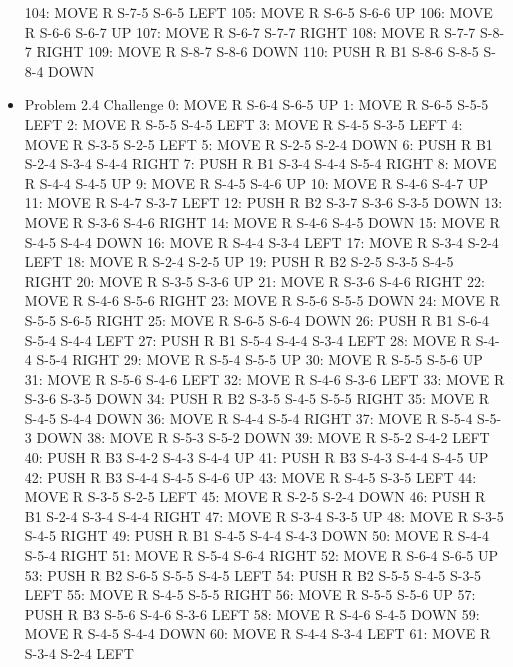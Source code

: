 \documentclass[12pt]{article}
\begin{document}
\begin{appendix}
\begin{itemize}
      104: MOVE R S-7-5 S-6-5 LEFT
      105: MOVE R S-6-5 S-6-6 UP
      106: MOVE R S-6-6 S-6-7 UP
      107: MOVE R S-6-7 S-7-7 RIGHT
      108: MOVE R S-7-7 S-8-7 RIGHT
      109: MOVE R S-8-7 S-8-6 DOWN
      110: PUSH R B1 S-8-6 S-8-5 S-8-4 DOWN
    \item Problem 2.4 Challenge
     0: MOVE R S-6-4 S-6-5 UP
        1: MOVE R S-6-5 S-5-5 LEFT
        2: MOVE R S-5-5 S-4-5 LEFT
        3: MOVE R S-4-5 S-3-5 LEFT
        4: MOVE R S-3-5 S-2-5 LEFT
        5: MOVE R S-2-5 S-2-4 DOWN
        6: PUSH R B1 S-2-4 S-3-4 S-4-4 RIGHT
        7: PUSH R B1 S-3-4 S-4-4 S-5-4 RIGHT
        8: MOVE R S-4-4 S-4-5 UP
        9: MOVE R S-4-5 S-4-6 UP
       10: MOVE R S-4-6 S-4-7 UP
       11: MOVE R S-4-7 S-3-7 LEFT
       12: PUSH R B2 S-3-7 S-3-6 S-3-5 DOWN
       13: MOVE R S-3-6 S-4-6 RIGHT
       14: MOVE R S-4-6 S-4-5 DOWN
       15: MOVE R S-4-5 S-4-4 DOWN
       16: MOVE R S-4-4 S-3-4 LEFT
       17: MOVE R S-3-4 S-2-4 LEFT
       18: MOVE R S-2-4 S-2-5 UP
       19: PUSH R B2 S-2-5 S-3-5 S-4-5 RIGHT
       20: MOVE R S-3-5 S-3-6 UP
       21: MOVE R S-3-6 S-4-6 RIGHT
       22: MOVE R S-4-6 S-5-6 RIGHT
       23: MOVE R S-5-6 S-5-5 DOWN
       24: MOVE R S-5-5 S-6-5 RIGHT
       25: MOVE R S-6-5 S-6-4 DOWN
       26: PUSH R B1 S-6-4 S-5-4 S-4-4 LEFT
       27: PUSH R B1 S-5-4 S-4-4 S-3-4 LEFT
       28: MOVE R S-4-4 S-5-4 RIGHT
       29: MOVE R S-5-4 S-5-5 UP
       30: MOVE R S-5-5 S-5-6 UP
       31: MOVE R S-5-6 S-4-6 LEFT
       32: MOVE R S-4-6 S-3-6 LEFT
       33: MOVE R S-3-6 S-3-5 DOWN
       34: PUSH R B2 S-3-5 S-4-5 S-5-5 RIGHT
       35: MOVE R S-4-5 S-4-4 DOWN
       36: MOVE R S-4-4 S-5-4 RIGHT
       37: MOVE R S-5-4 S-5-3 DOWN
       38: MOVE R S-5-3 S-5-2 DOWN
       39: MOVE R S-5-2 S-4-2 LEFT
       40: PUSH R B3 S-4-2 S-4-3 S-4-4 UP
       41: PUSH R B3 S-4-3 S-4-4 S-4-5 UP
       42: PUSH R B3 S-4-4 S-4-5 S-4-6 UP
       43: MOVE R S-4-5 S-3-5 LEFT
       44: MOVE R S-3-5 S-2-5 LEFT
       45: MOVE R S-2-5 S-2-4 DOWN
       46: PUSH R B1 S-2-4 S-3-4 S-4-4 RIGHT
       47: MOVE R S-3-4 S-3-5 UP
       48: MOVE R S-3-5 S-4-5 RIGHT
       49: PUSH R B1 S-4-5 S-4-4 S-4-3 DOWN
       50: MOVE R S-4-4 S-5-4 RIGHT
       51: MOVE R S-5-4 S-6-4 RIGHT
       52: MOVE R S-6-4 S-6-5 UP
       53: PUSH R B2 S-6-5 S-5-5 S-4-5 LEFT
       54: PUSH R B2 S-5-5 S-4-5 S-3-5 LEFT
       55: MOVE R S-4-5 S-5-5 RIGHT
       56: MOVE R S-5-5 S-5-6 UP
       57: PUSH R B3 S-5-6 S-4-6 S-3-6 LEFT
       58: MOVE R S-4-6 S-4-5 DOWN
       59: MOVE R S-4-5 S-4-4 DOWN
       60: MOVE R S-4-4 S-3-4 LEFT
       61: MOVE R S-3-4 S-2-4 LEFT

\end{itemize}
\end{appendix}
\end{document}
